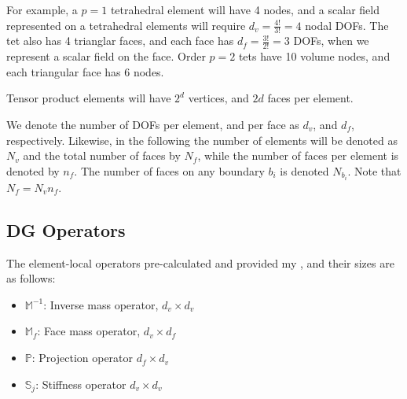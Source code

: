 \documentclass[11pt]{article}
\begin{document}
For example, a $p=1$ tetrahedral element will have 4 nodes, and a scalar field represented on a tetrahedral elements will require $d_v = \frac{4!}{3!} = 4$ nodal DOFs. The tet also has 4 trianglar faces, and each face has $d_f = \frac{3!}{2!} = 3$ DOFs, when we represent a scalar field on the face. Order $p=2$ tets have 10 volume nodes, and each triangular face has 6 nodes. 

Tensor product elements will have $2^d$ vertices, and $2d$ faces per element.

We denote the number of DOFs per element, and per face as $d_v$, and $d_f$, respectively. Likewise, in the following the number of elements will be denoted as $N_v$ and the total number of faces by $N_f$, while the number of faces per element is denoted by $n_f$.  The number of faces on any boundary $b_i$ is denoted $N_{b_i}$.  Note that $N_f = N_v n_f$.

\subsection{\ceesdcode{} DG Operators}

The element-local operators pre-calculated and provided my \ceesdcode{}, and their sizes are as follows:  
\begin{itemize}
\item $\mathbb{M}^{-1}$: Inverse mass operator, $d_v \times d_v$
\item $\mathbb{M}_f$: Face mass operator, $d_v \times d_f$
\item $\mathbb{P}$: Projection operator $d_f \times d_v$
\item $\mathbb{S}_j$: Stiffness operator $d_v \times d_v$
\end{itemize}
\end{document}
